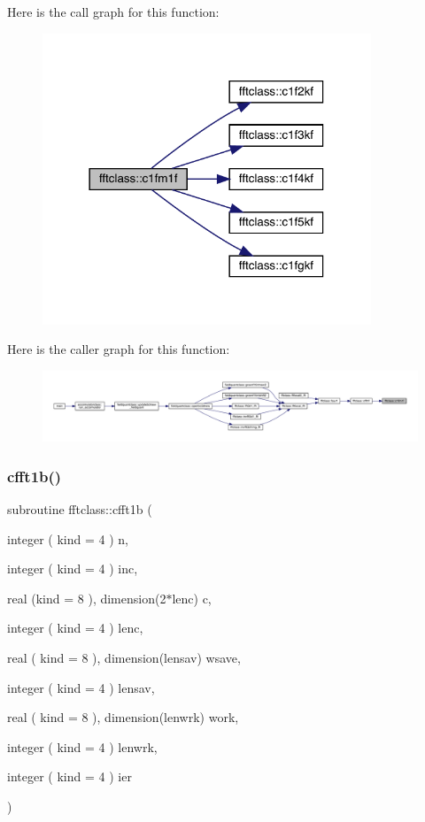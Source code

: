 Here is the call graph for this function\+:\nopagebreak
\begin{figure}[H]
\begin{center}
\leavevmode
\includegraphics[width=278pt]{namespacefftclass_a8870afa6b2bab24460d719026aa6e0d8_cgraph}
\end{center}
\end{figure}
Here is the caller graph for this function\+:\nopagebreak
\begin{figure}[H]
\begin{center}
\leavevmode
\includegraphics[width=350pt]{namespacefftclass_a8870afa6b2bab24460d719026aa6e0d8_icgraph}
\end{center}
\end{figure}
\mbox{\label{namespacefftclass_acc0dd0d3644e3ff67fd2dfb23dcb4e40}} 
\subsubsection{\texorpdfstring{cfft1b()}{cfft1b()}}
{\footnotesize\ttfamily subroutine fftclass\+::cfft1b (\begin{DoxyParamCaption}\item[{integer ( kind = 4 )}]{n,  }\item[{integer ( kind = 4 )}]{inc,  }\item[{real (kind = 8 ), dimension(2$\ast$lenc)}]{c,  }\item[{integer ( kind = 4 )}]{lenc,  }\item[{real ( kind = 8 ), dimension(lensav)}]{wsave,  }\item[{integer ( kind = 4 )}]{lensav,  }\item[{real ( kind = 8 ), dimension(lenwrk)}]{work,  }\item[{integer ( kind = 4 )}]{lenwrk,  }\item[{integer ( kind = 4 )}]{ier }\end{DoxyParamCaption})}

